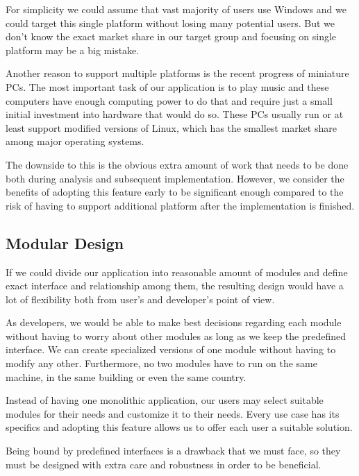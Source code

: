 For simplicity we could assume that vast majority of users use Windows and we could target this single platform without losing many potential users. But we don't know the exact market share in our target group and focusing on single platform may be a big mistake.
\par
Another reason to support multiple platforms is the recent progress of miniature PCs. The most important task of our application is to play music and these computers have enough computing power to do that and require just a small initial investment into hardware that would do so. These PCs usually run or at least support modified versions of Linux, which has the smallest market share among major operating systems.
\par
The downside to this is the obvious extra amount of work that needs to be done both during analysis and subsequent implementation. However, we consider the benefits of adopting this feature early to be significant enough compared to the risk of having to support additional platform after the implementation is finished.
\subsection{Modular Design}

If we could divide our application into reasonable amount of modules and define exact interface and relationship among them, the resulting design would have a lot of flexibility both from user's and developer's point of view.
\par
As developers, we would be able to make best decisions regarding each module without having to worry about other modules as long as we keep the predefined interface. We can create specialized versions of one module without having to modify any other. Furthermore, no two modules have to run on the same machine, in the same building or even the same country.
\par
Instead of having one monolithic application, our users may select suitable modules for their needs and customize it to their needs. Every use case has its specifics and adopting this feature allows us to offer each user a suitable solution.
\par
Being bound by predefined interfaces is a drawback that we must face, so they must be designed with extra care and robustness in order to be beneficial.
